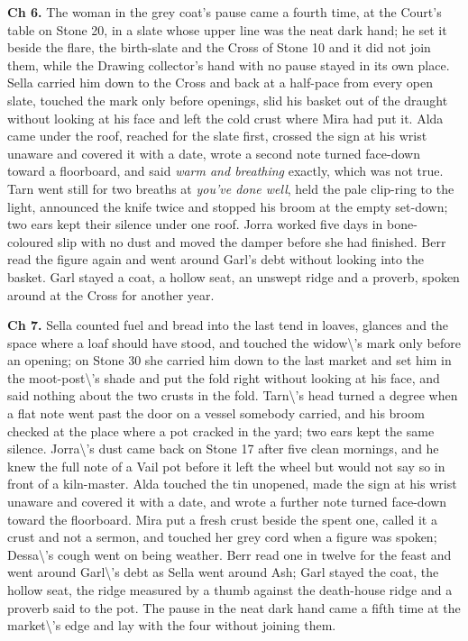 \documentclass{design/chronicle}
\begin{document}
{\textbf{Ch 6.} The woman in the grey coat’s pause came a fourth time, at the Court’s table on Stone 20, in a slate whose upper line was the neat dark hand; he set it beside the flare, the birth-slate and the Cross of Stone 10 and it did not join them, while the Drawing collector’s hand with no pause stayed in its own place. Sella carried him down to the Cross and back at a half-pace from every open slate, touched the mark only before openings, slid his basket out of the draught without looking at his face and left the cold crust where Mira had put it. Alda came under the roof, reached for the slate first, crossed the sign at his wrist unaware and covered it with a date, wrote a second note turned face-down toward a floorboard, and said \emph{warm and breathing} exactly, which was not true. Tarn went still for two breaths at \emph{you’ve done well}, held the pale clip-ring to the light, announced the knife twice and stopped his broom at the empty set-down; two ears kept their silence under one roof. Jorra worked five days in bone-coloured slip with no dust and moved the damper before she had finished. Berr read the figure again and went around Garl’s debt without looking into the basket. Garl stayed a coat, a hollow seat, an unswept ridge and a proverb, spoken around at the Cross for another year.

\textbf{Ch 7.} Sella counted fuel and bread into the last tend in loaves, glances and the space where a loaf should have stood, and touched the widow\textbackslash{}’s mark only before an opening; on Stone 30 she carried him down to the last market and set him in the moot-post\textbackslash{}’s shade and put the fold right without looking at his face, and said nothing about the two crusts in the fold. Tarn\textbackslash{}’s head turned a degree when a flat note went past the door on a vessel somebody carried, and his broom checked at the place where a pot cracked in the yard; two ears kept the same silence. Jorra\textbackslash{}’s dust came back on Stone 17 after five clean mornings, and he knew the full note of a Vail pot before it left the wheel but would not say so in front of a kiln-master. Alda touched the tin unopened, made the sign at his wrist unaware and covered it with a date, and wrote a further note turned face-down toward the floorboard. Mira put a fresh crust beside the spent one, called it a crust and not a sermon, and touched her grey cord when a figure was spoken; Dessa\textbackslash{}’s cough went on being weather. Berr read one in twelve for the feast and went around Garl\textbackslash{}’s debt as Sella went around Ash; Garl stayed the coat, the hollow seat, the ridge measured by a thumb against the death-house ridge and a proverb said to the pot. The pause in the neat dark hand came a fifth time at the market\textbackslash{}’s edge and lay with the four without joining them.

}
\end{document}
